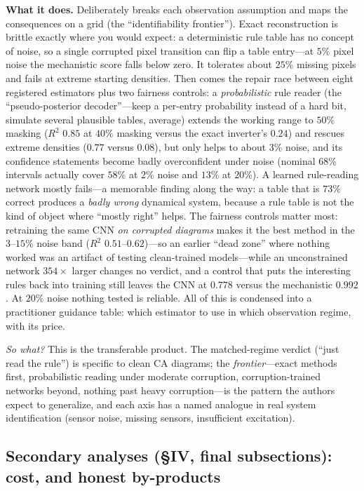 \documentclass[11pt,a4paper]{article}
\newcommand{\sowhat}[1]{\emph{So what?} #1}
\begin{document}
\textbf{What it does.} Deliberately breaks each observation assumption and
maps the consequences on a grid (the ``identifiability frontier''). Exact
reconstruction is brittle exactly where you would expect: a deterministic
rule table has no concept of noise, so a single corrupted pixel transition
can flip a table entry---at $5\%$ pixel noise the mechanistic score falls
below zero. It tolerates about $25\%$ missing pixels and fails at extreme
starting densities. Then comes the repair race between eight registered
estimators plus two fairness controls: a \emph{probabilistic} rule reader
(the ``pseudo-posterior decoder''---keep a per-entry probability instead of
a hard bit, simulate several plausible tables, average) extends the working
range to $50\%$ masking ($R^2$ $0.85$ at $40\%$ masking versus the exact
inverter's $0.24$) and rescues extreme densities ($0.77$ versus $0.08$),
but only helps to about $3\%$ noise, and its confidence statements become
badly overconfident under noise (nominal $68\%$ intervals actually cover
$58\%$ at $2\%$ noise and $13\%$ at $20\%$). A learned rule-reading network
mostly fails---a memorable finding along the way: a table that is $73\%$
correct produces a \emph{badly wrong} dynamical system, because a rule
table is not the kind of object where ``mostly right'' helps. The fairness
controls matter most: retraining the same CNN \emph{on corrupted diagrams}
makes it the best method in the $3$--$15\%$ noise band ($R^2$
$0.51$--$0.62$)---so an earlier ``dead zone'' where nothing worked was an
artifact of testing clean-trained models---while an unconstrained network
$354\times$ larger changes no verdict, and a control that puts the
interesting rules back into training still leaves the CNN at $0.778$ versus
the mechanistic $0.992$. At $20\%$ noise nothing tested is reliable. All of
this is condensed into a practitioner guidance table: which estimator to use
in which observation regime, with its price.

\sowhat{This is the transferable product. The matched-regime verdict
(``just read the rule'') is specific to clean CA diagrams; the
\emph{frontier}---exact methods first, probabilistic reading under moderate
corruption, corruption-trained networks beyond, nothing past heavy
corruption---is the pattern the authors expect to generalize, and each axis
has a named analogue in real system identification (sensor noise, missing
sensors, insufficient excitation).}

\subsection*{Secondary analyses (\S IV, final subsections): cost, and honest by-products}
\end{document}
